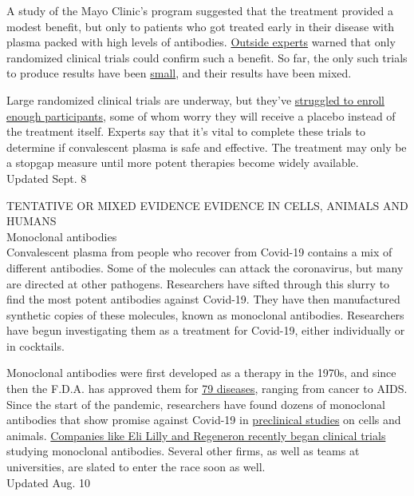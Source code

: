 A study of the Mayo Clinic's program suggested that the treatment
provided a modest benefit, but only to patients who got treated early in
their disease with plasma packed with high levels of antibodies.
\href{https://www.nytimes3xbfgragh.onion/2020/08/24/health/fda-blood-plasma.html}{Outside
experts} warned that only randomized clinical trials could confirm such
a benefit. So far, the only such trials to produce results have been
\href{https://www.nytimes3xbfgragh.onion/2020/05/22/health/coronarvirus-convalescent-serum.html?searchResultPosition=2}{small},
and their results have been mixed.

Large randomized clinical trials are underway, but they've
\href{https://www.nytimes3xbfgragh.onion/2020/08/04/health/trump-plasma.html}{struggled
to enroll enough participants}, some of whom worry they will receive a
placebo instead of the treatment itself. Experts say that it's vital to
complete these trials to determine if convalescent plasma is safe and
effective. The treatment may only be a stopgap measure until more potent
therapies become widely available.\\
Updated Sept. 8

TENTATIVE OR MIXED EVIDENCE EVIDENCE IN CELLS, ANIMALS AND HUMANS\\
Monoclonal antibodies\\
Convalescent plasma from people who recover from Covid-19 contains a mix
of different antibodies. Some of the molecules can attack the
coronavirus, but many are directed at other pathogens. Researchers have
sifted through this slurry to find the most potent antibodies against
Covid-19. They have then manufactured synthetic copies of these
molecules, known as monoclonal antibodies. Researchers have begun
investigating them as a treatment for Covid-19, either individually or
in cocktails.

Monoclonal antibodies were first developed as a therapy in the 1970s,
and since then the F.D.A. has approved them for
\href{https://jbiomedsci.biomedcentral.com/articles/10.1186/s12929-019-0592-z}{79
diseases}, ranging from cancer to AIDS. Since the start of the pandemic,
researchers have found dozens of monoclonal antibodies that show promise
against Covid-19 in
\href{https://www.nytimes3xbfgragh.onion/reuters/2020/08/03/us/03reuters-health-coronavirus-regeneron.html}{preclinical
studies} on cells and animals.
\href{https://www.nytimes3xbfgragh.onion/2020/07/09/health/regeneron-monoclonal-antibodies.html}{Companies
like Eli Lilly and Regeneron recently began clinical trials} studying
monoclonal antibodies. Several other firms, as well as teams at
universities, are slated to enter the race soon as well.\\
Updated Aug. 10

